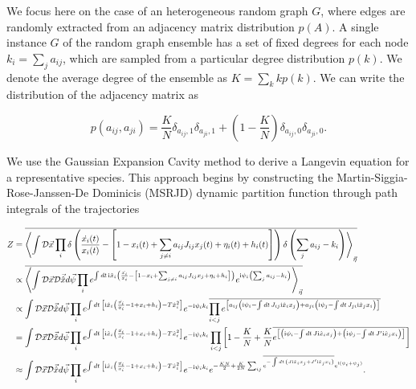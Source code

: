 \documentclass[
    preprint,
    linenumbers,
    amsmath,amssymb,amsfonts,
    aps, physrev,
    superscriptaddress,
    10pt,
    bibnotes
    ]{revtex4-2}
\begin{document}
We focus here on the case of an heterogeneous random graph $G$, where
edges are randomly extracted from an adjacency matrix distribution
$p(A)$. A single instance $G$ of the random graph ensemble has a
set of fixed degrees for each node $k_{i}=\sum_{j}a_{ij}$, which
are sampled from a particular degree distribution $p(k)$. We denote
the average degree of the ensemble as $K=\sum_{k}kp(k)$. We can write
the distribution of the adjacency matrix as

\[
p(a_{ij},a_{ji})=\frac{K}{N}\delta_{a_{ij},1}\delta_{a_{ji},1}+\left(1-\frac{K}{N}\right)\delta_{a_{ij},0}\delta_{a_{ji},0}.
\]

We use the Gaussian Expansion Cavity method \cite{taraboloGaussianApproximationDynamic2025}
to derive a Langevin equation for a representative species. This approach
begins by constructing the Martin-Siggia-Rose-Janssen-De Dominicis
(MSRJD) dynamic partition function through path integrals of the trajectories
\cite{martinStatisticalDynamicsClassical1973,janssenLagrangeanClassicalField1976,dedominicisDynamicsSubstituteReplicas1978}

\begin{subequations}
\begin{align}
Z & =\overline{\left\langle \int\mathcal{D}\vec{x}\prod_{i}\delta\left(\frac{\dot{x_{i}}(t)}{x_{i}(t)}-\left[1-x_{i}(t)+\sum_{j\neq i}a_{ij}J_{ij}x_{j}(t)+\eta_{i}(t)+h_{i}(t)\right]\right)\delta\left(\sum_{j}a_{ij}-k_{i}\right)\right\rangle _{\vec{\eta}}}\\
 & \propto\overline{\left\langle \int\mathcal{D}\vec{x}\mathcal{D}\vec{\hat{x}}d\vec{\psi}\prod_{i}e^{\int dt\,{\rm i}\hat{x}_{i}\left(\frac{\dot{x_{i}}}{x_{i}}-\left[1-x_{i}+\sum_{j\neq i}a_{ij}J_{ij}x_{j}+\eta_{i}+h_{i}\right]\right)}e^{{\rm i}\psi_{i}\left(\sum_{j}a_{ij}-k_{i}\right)}\right\rangle _{\vec{\eta}}}\\
 & \propto\int\mathcal{D}\vec{x}\mathcal{D}\vec{\hat{x}}d\vec{\psi}\prod_{i}e^{\int dt\,\left[{\rm i}\hat{x}_{i}\left(\frac{\dot{x_{i}}}{x_{i}}-1+x_{i}+h_{i}\right)-T\hat{x}_{i}^{2}\right]}e^{-{\rm i}\psi_{i}k_{i}}\overline{\prod_{i<j}e^{\left[a_{ij}\left({\rm i}\psi_{i}-\int dt\,J_{ij}{\rm i}\hat{x}_{i}x_{j}\right)+a_{ji}\left({\rm i}\psi_{j}-\int dt\,J_{ji}{\rm i}\hat{x}_{j}x_{i}\right)\right]}}\\
 & =\int\mathcal{D}\vec{x}\mathcal{D}\vec{\hat{x}}d\vec{\psi}\prod_{i}e^{\int dt\,\left[{\rm i}\hat{x}_{i}\left(\frac{\dot{x_{i}}}{x_{i}}-1+x_{i}+h_{i}\right)-T\hat{x}_{i}^{2}\right]}e^{-{\rm i}\psi_{i}k_{i}}\prod_{i<j}\left[1-\frac{K}{N}+\frac{K}{N}\overline{e^{\left[\left({\rm i}\psi_{i}-\int dt\,J{\rm i}\hat{x}_{i}x_{j}\right)+\left({\rm i}\psi_{j}-\int dt\,J'{\rm i}\hat{x}_{j}x_{i}\right)\right]}}\right]\\
 & \approx\int\mathcal{D}\vec{x}\mathcal{D}\vec{\hat{x}}d\vec{\psi}\prod_{i}e^{\int dt\,\left[{\rm i}\hat{x}_{i}\left(\frac{\dot{x_{i}}}{x_{i}}-1+x_{i}+h_{i}\right)-T\hat{x}_{i}^{2}\right]}e^{-{\rm i}\psi_{i}k_{i}}e^{-\frac{KN}{2}+\frac{K}{2N}\sum_{ij}\overline{e^{-\int dt\,\left(J{\rm i}\hat{x}_{i}x_{j}+J'{\rm i}\hat{x}_{j}x_{i}\right)}}e^{{\rm i}(\psi_{i}+\psi_{j})}}.
\end{align}
\end{subequations}
\end{document}
